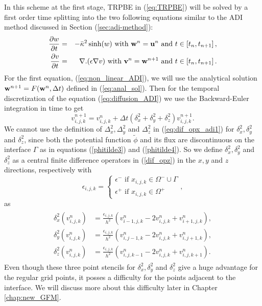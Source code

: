 In this scheme at the first stage, TRPBE in  (\ref{eq:TRPBE}) will be solved by a first order time splitting into the two following equations similar to the ADI method discussed in Section (\ref{sec:adi-method}): 
\begin{eqnarray}
  \frac{\partial w}{\partial t}&=& -\bar\kappa^2 \sinh(w) \text{ with } {\bf w}^n={\bf u}^n\text{ and } t \in \left[t_n,t_{n+1}\right],\label{eq:non_linear_ADI}\\
 \frac{\partial v}{\partial t}&=&  \nabla . (\epsilon\nabla v) \text{ with } {\bf v}^n={\bf w}^{n+1}\text{ and } t \in \left[t_n,t_{n+1}\right].	 \label{eq:diffusion_ADI}
\end{eqnarray}  
For the first equation, (\ref{eq:non_linear_ADI}), we will use the analytical solution ${\bf w}^{n+1}=F({\bf w}^n,\Delta t)$ defined in (\ref{eq:anal_sol}). Then for the temporal discretization of the equation (\ref{eq:diffusion_ADI}) we use the Backward-Euler integration in time to get 
\begin{equation}
	v_{i,j,k}^{n+1} =v_{i,j,k}^{n}+\Delta t \left(\delta_x^2+\delta_y^2+\delta_z^2\right)v_{i,j,k}^{n+1}. \label{eq:imp-eu}
\end{equation}	
We cannot use the definition of $\Delta_x^2,\Delta_y^2$ and $\Delta_z^2$ in (\ref {eq:dif_opx_adi1}) for $\delta_x^2,\delta_y^2$ and $\delta_z^2$, since both the potential function $\tilde \phi$ and its flux are discontinuous on the interface $\Gamma$ as in equations (\ref{phitilde3}) and (\ref{phitilde4}). So we define $\delta_x^2,\delta_y^2$ and $\delta_z^2$ as a central finite difference operators in (\ref{dif_opz}) in the $x,y$ and $z$ directions, respectively with 
\begin{equation}
	\epsilon_{i,j,k}= \displaystyle\begin{cases}
	\epsilon^- \text{ if } x_{i,j,k}\in\Omega^- \cup \Gamma \\
	\epsilon^+ \text{ if } x_{i,j,k}\in\Omega^+
	\end{cases},
\end{equation}
as
 \begin{eqnarray}
 \begin{aligned}
	\delta_x^2\left(v_{i,j,k}^n\right)&= \frac{\epsilon_{i,j,k}}{h^2} \left(v_{i-1,j,k}^n-2v_{i,j,k}^n+v_{i+1,j,k}^n\right), \\ \label{dif_opx}
	\delta_y^2\left(v_{i,j,k}^n\right)&= \frac{\epsilon_{i,j,k}}{h^2} \left(v_{i,j-1,k}^n-2v_{i,j,k}^n+v_{i,j+1,k}^n\right),\\ %
	\delta_z^2\left(v_{i,j,k}^n\right)&= \frac{\epsilon_{i,j,k}}{h^2} \left(v_{i,j,k-1}^n-2v_{i,j,k}^n+v_{i,j,k+1}^n\right). \label{dif_opz}
\end{aligned}
\end{eqnarray}
Even though these three point stencils for $\delta_x^2,\delta_y^2$ and $\delta_z^2$ give a huge advantage for the regular grid points, it posses a difficulty for the points adjacent to the interface. We will discuss more about this difficulty later in Chapter \ref{chap:new_GFM}.
  
